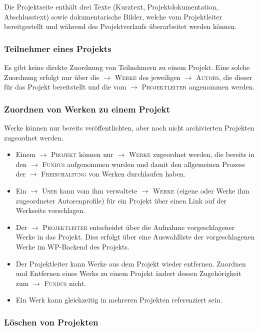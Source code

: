 \documentclass[a4paper,11pt]{article}
\newcommand{\glossar}[1]{{$\to$ \textsc{#1}}}
\begin{document}
Die Projektseite enthält drei Texte (Kurztext, Projektdokumentation,
Abschlusstext) sowie dokumentarische Bilder, welche vom Projektleiter
bereitgestellt und während des Projektverlaufs überarbeitet werden können.

\subsubsection{Teilnehmer eines Projekts}

Es gibt keine direkte Zuordnung von Teilnehmern zu einem Projekt. Eine solche
Zuordnung erfolgt nur über die \glossar{Werke} des jeweiligen \glossar{Autors},
die dieser für das Projekt bereitstellt und die vom \glossar{Projektleiter}
angenommen werden.

\subsubsection{Zuordnen von Werken zu einem Projekt}

Werke können nur bereits veröffentlichten, aber noch nicht archivierten
Projekten zugeordnet werden. 
\begin{itemize}
\item Einem \glossar{Projekt} können nur \glossar{Werke} zugeordnet werden, die
  bereits in den \glossar{Fundus} aufgenommen wurden und damit den allgemeinen
  Prozess der \glossar{Freischaltung} von Werken durchlaufen haben.

\item Ein \glossar{User} kann vom ihm verwaltete \glossar{Werke} (eigene oder
  Werke ihm zugeordneter Autorenprofile) für ein Projekt über einen Link auf
  der Werkseite vorschlagen.

\item Der \glossar{Projektleiter} entscheidet über die Aufnahme vorgeschlagener
  Werke in das Projekt. Dies erfolgt über eine Auswahlliste der vorgeschlagenen
  Werke im WP-Backend des Projekts.

\item Der Projektleiter kann Werke aus dem Projekt wieder entfernen.  Zuordnen
  und Entfernen eines Werks zu einem Projekt ändert dessen Zugehörigkeit zum
  \glossar{Fundus} nicht.

\item Ein Werk kann gleichzeitig in mehreren Projekten referenziert sein.
\end{itemize}

\subsubsection{Löschen von Projekten}
\end{document}
